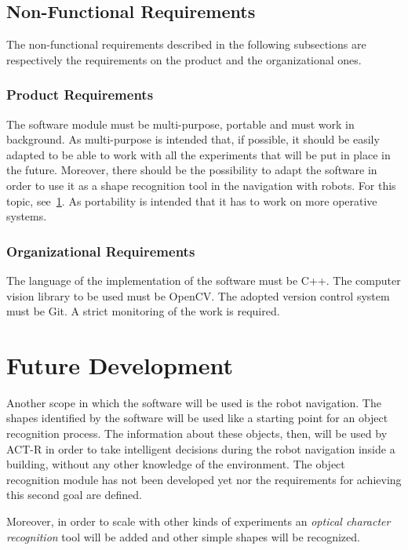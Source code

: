 		\subsection{Non-Functional Requirements}
		The non-functional requirements described in the following subsections are respectively the requirements on the product and the organizational ones.

			\subsubsection{Product Requirements}
			The software module must be multi-purpose, portable and must work in background.
			As multi-purpose is intended that, if possible, it should be easily adapted to be able to work with all the experiments that will be put in place in the future. Moreover, there should be the possibility to adapt the software in order to use it as a shape recognition tool in the navigation with robots. For this topic, see~\ref{futureDev}. 
			As portability is intended that it has to work on more operative systems.
	
			\subsubsection{Organizational Requirements}
			The language of the implementation of the software must be C++. 
			The computer vision library to be used must be OpenCV.
			The adopted version control system must be Git.
			A strict monitoring of the work is required.

	\section{Future Development}\label{futureDev}
		Another scope in which the software will be used is the robot navigation. 
		The shapes identified by the software will be used like a starting point for an object recognition process. 
		The information about these objects, then, will be used by ACT-R in order to take intelligent decisions during the robot navigation inside a building, without any other knowledge of the environment. 
		The object recognition module has not been developed yet nor the requirements for achieving this second goal are defined. 	

		Moreover, in order to scale with other kinds of experiments an \emph{optical character recognition} tool will be added and other simple shapes will be recognized.



